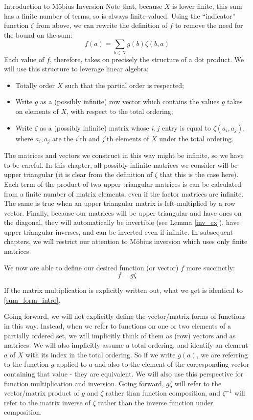 \documentclass[12pt]{pom_thesis}
\begin{document}
\begin{chapter}{Introduction to M\"obius Inversion}
Note that, because $X$ is lower finite, this sum has a finite number of terms, so is always finite-valued. Using the ``indicator'' function $\zeta$ from above, we can rewrite the definition of $f$ to remove the need for the bound on the sum:
\begin{equation}\label{sum_form_intro}
f(a) = \sum_{b \in X}g(b)\zeta(b,a)
\end{equation}
Each value of $f$, therefore, takes on precisely the structure of a dot product. We will use this structure to leverage linear algebra: 
\begin{itemize}
\item Totally order $X$ such that the partial order is respected;
\item Write $g$ as a (possibly infinite) row vector which contains the values $g$ takes on elements of $X$, with respect to the total ordering;
\item Write $\zeta$ as a (possibly infinite) matrix whose $i,j$ entry is equal to $\zeta(a_i, a_j)$, where $a_i, a_j$ are the $i$'th and $j$'th elements of $X$ under the total ordering.
\end{itemize}

The matrices and vectors we construct in this way might be infinite, so we have to be careful. In this chapter, all possibly infinite matrices we consider will be upper triangular (it is clear from the definition of $\zeta$ that this is the case here). Each term of the product of two upper triangular matrices is can be calculated from a finite number of matrix elements, even if the factor matrices are infinite. The same is true when an upper triangular matrix is left-multiplied by a row vector. Finally, because our matrices will be upper triangular and have ones on the diagonal, they will automatically be invertible (see Lemma \ref{inv_ex}), have upper triangular inverses, and can be inverted even if infinite. In subsequent chapters, we will restrict our attention to M\"obius inversion which uses only finite matrices.

We now are able to define our desired function (or vector) $f$ more succinctly:
\[
f = g \zeta
\]

If the matrix multiplication is explicitly written out, what we get is identical to \eqref{sum_form_intro}.

Going forward, we will not explicitly define the vector/matrix forms of functions in this way. Instead, when we refer to functions on one or two elements of a partially ordered set, we will implicitly think of them as (row) vectors and as matrices. We will also implicitly assume a total ordering, and identify an element $a$ of $X$ with its index in the total ordering. So if we write $g(a)$, we are referring to the function $g$ applied to $a$ and also to the element of the corresponding vector containing that value - they are equivalent. We will also use this perspective for function multiplication and inversion. Going forward, $g\zeta$ will refer to the vector/matrix product of $g$ and $\zeta$ rather than function composition, and $\zeta^{-1}$ will refer to the matrix inverse of $\zeta$ rather than the inverse function under composition.


\end{chapter}
\end{document}
